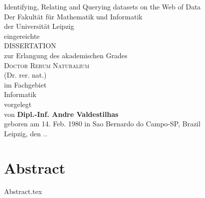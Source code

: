 \documentclass[a4paper,twoside,abstracton,12pt,BCOR=15mm]{scrreprt}
\begin{document}
\renewcommand{\thepage}{\Roman{page}}

\begin{titlepage}

\begin{center}
\large

$\quad$\\
$\quad$\\
{\Huge Identifying, Relating and Querying datasets on the Web of Data}\\ 
\vspace{1cm}
Der Fakult\"at f\"ur Mathematik und Informatik\\
der Universit\"at Leipzig\\
eingereichte\\
\vspace{1cm}
{\Huge DISSERTATION}\\
\vspace{1cm}
zur Erlangung des akademischen Grades\\
\vspace{1cm}
{\Large \scshape{Doctor Rerum Naturalium}}\\
(Dr. rer. nat.)\\
\vspace{1cm}
im Fachgebiet\\
{\large Informatik}\\
\vspace{1cm}
vorgelegt\\
\vspace{1cm}
{von \textbf{Dipl.-Inf. Andre Valdestilhas}}\\
\vspace{1cm}
geboren am 14. Feb. 1980 in Sao Bernardo do Campo-SP, Brazil\\
\vspace{1cm}
Leipzig, den \the\day.\the\month.\the\year

\vfill

\end{center}
\cleardoublepage
\end{titlepage}

\tableofcontents

\chapter{Abstract}
{Abstract.tex}
\end{document}
